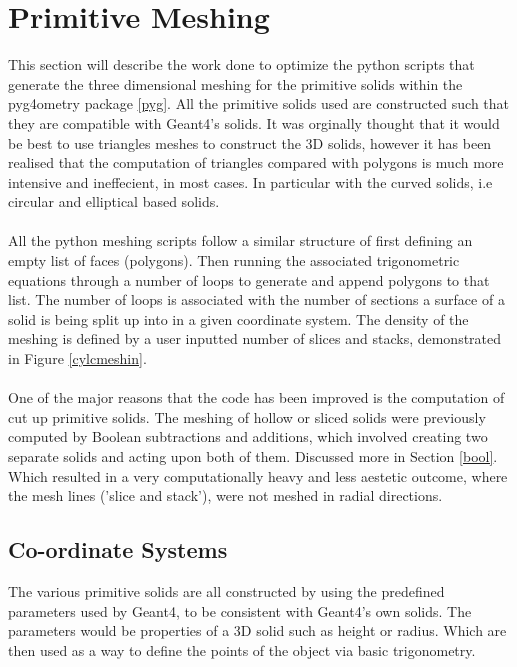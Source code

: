 \documentclass[12pt,a4paper]{article}
\begin{document}
\section{Primitive Meshing}
\label{prim}
This section will describe the work done to optimize the python scripts that generate the three dimensional meshing for the primitive solids within the pyg4ometry package \ref{pyg}. All the primitive solids used are constructed such that they are compatible with Geant4's solids. It was orginally thought that it would be best to use triangles meshes to construct the 3D solids, however it has been realised that the computation of triangles compared with polygons is much more intensive and ineffecient, in most cases. In particular with the curved solids, i.e circular and elliptical based solids.
\\\\
All the python meshing scripts follow a similar structure of first defining an empty list of faces (polygons). Then running the associated trigonometric equations through a number of loops to generate and append polygons to that list. The number of loops is associated with the number of sections a surface of a solid is being split up into in a given coordinate system. The density of the meshing is defined by a user inputted number of slices and stacks, demonstrated in Figure \ref{cylcmeshin}.
\\\\
One of the major reasons that the code has been improved is the computation of cut up primitive solids. The meshing of hollow or sliced solids were previously computed by Boolean subtractions and additions, which involved creating two separate solids and acting upon both of them. Discussed more in Section \ref{bool}. Which resulted in a very computationally heavy and less aestetic outcome, where the mesh lines ('slice and stack'), were not meshed in radial directions.

\subsection{Co-ordinate Systems}
The various primitive solids are all constructed by using the predefined parameters used by Geant4, to be consistent with Geant4's own solids. The parameters would be properties of a 3D solid such as height or radius. Which are then used as a way to define the points of the object via basic trigonometry.\
\end{document}

